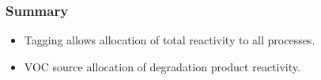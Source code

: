 \begin{frame}
    \frametitle{Summary}

    \begin{itemize}
        \item Tagging allows allocation of total reactivity to all processes. \vspace{8mm}
        \item VOC source allocation of degradation product reactivity.
    \end{itemize}
\end{frame}
